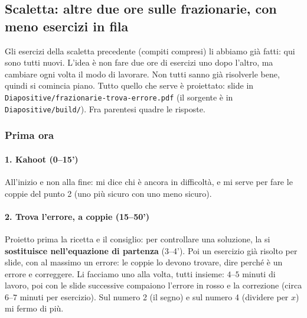 \documentclass[11pt]{report}
\begin{document}
\subsection{Scaletta: altre due ore sulle frazionarie, con meno esercizi in fila}

Gli esercizi della scaletta precedente (compiti compresi) li abbiamo già fatti: qui sono tutti nuovi. L'idea è non fare due ore di esercizi uno dopo l'altro, ma cambiare ogni volta il modo di lavorare. Non tutti sanno già risolverle bene, quindi si comincia piano. Tutto quello che serve è proiettato: slide in \texttt{Diapositive/frazionarie-trova-errore.pdf} (il sorgente è in \texttt{Diapositive/build/}). Fra parentesi quadre le risposte.

\subsubsection*{Prima ora}

\paragraph{1. Kahoot (0--15')}
All'inizio e non alla fine: mi dice chi è ancora in difficoltà, e mi serve per fare le coppie del punto 2 (uno più sicuro con uno meno sicuro).

\paragraph{2. Trova l'errore, a coppie (15--50')}
Proietto prima la ricetta e il consiglio: per controllare una soluzione, la si \textbf{sostituisce nell'equazione di partenza} (3--4'). Poi un esercizio già risolto per slide, con al massimo un errore: le coppie lo devono trovare, dire perché è un errore e correggere. Li facciamo uno alla volta, tutti insieme: $4$--$5$ minuti di lavoro, poi con le slide successive compaiono l'errore in rosso e la correzione (circa $6$--$7$ minuti per esercizio). Sul numero 2 (il segno) e sul numero 4 (dividere per $x$) mi fermo di più.
\end{document}
